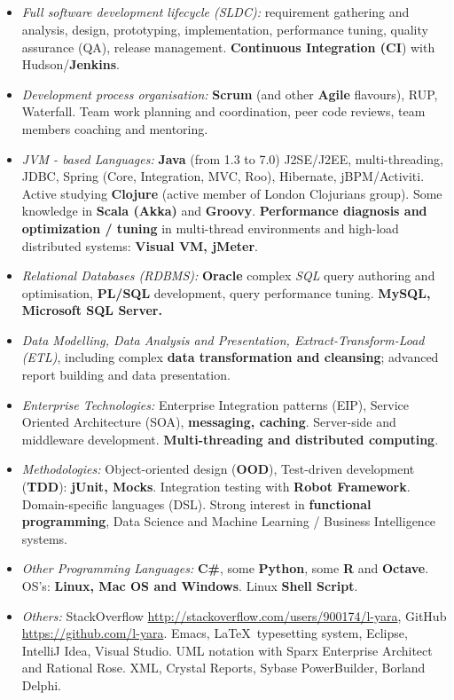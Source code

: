 \documentclass{res}
\begin{document}
\begin{resume}
\section{}
\vspace{8pt}
\begin{itemize}
  \item {\em Full software development lifecycle (SLDC):} requirement gathering and analysis, design, prototyping, implementation, performance tuning, quality assurance (QA), release management. {\bf Continuous Integration (CI}) with Hudson/{\bf Jenkins}.
  \item {\em Development process organisation:} {\bf Scrum} (and other {\bf Agile} flavours), RUP, Waterfall. Team work planning and coordination, peer code reviews, team members coaching and mentoring.
  \item {\em JVM - based Languages:} {\bf Java} (from 1.3 to 7.0) J2SE/J2EE, multi-threading, JDBC, Spring (Core, Integration, MVC, Roo), Hibernate, jBPM/Activiti. Active studying {\bf Clojure} (active member of London Clojurians group). Some knowledge in {\bf Scala (Akka)} and {\bf Groovy}. {\bf Performance diagnosis and optimization / tuning} in multi-thread environments and high-load distributed systems: {\bf Visual VM, jMeter}.
  \item {\em Relational Databases (RDBMS):} {\bf Oracle} complex {\em SQL} query authoring and optimisation, {\bf PL/SQL} development, query performance tuning. {\bf MySQL, Microsoft SQL Server.}
  \item {\em Data Modelling, Data Analysis and Presentation, Extract-Transform-Load (ETL)}, including complex {\bf data transformation and cleansing}; advanced report building and data presentation.
  \item {\em Enterprise Technologies:} Enterprise Integration patterns (EIP), Service Oriented Architecture (SOA), {\bf messaging, caching}. Server-side and middleware development. {\bf Multi-threading and distributed computing}.
  \item {\em Methodologies:} Object-oriented design ({\bf OOD}), Test-driven development ({\bf TDD}): {\bf jUnit, Mocks}. Integration testing with {\bf Robot Framework}. Domain-specific languages (DSL). Strong interest in {\bf functional programming}, Data Science and Machine Learning / Business Intelligence systems.

  \item {\em Other Programming Languages:} {\bf C\#}, some {\bf Python}, some {\bf R} and {\bf Octave}. OS’s: {\bf Linux, Mac OS and Windows}. Linux {\bf Shell Script}.
  \item {\em Others:} StackOverflow \url{http://stackoverflow.com/users/900174/l-yara}, GitHub \url{https://github.com/l-yara}. Emacs, \LaTeX ~typesetting system, Eclipse, IntelliJ Idea, Visual Studio. UML notation with Sparx Enterprise Architect and Rational Rose. XML, Crystal Reports, Sybase PowerBuilder, Borland Delphi.
\end{itemize}


\end{resume}
\end{document}
